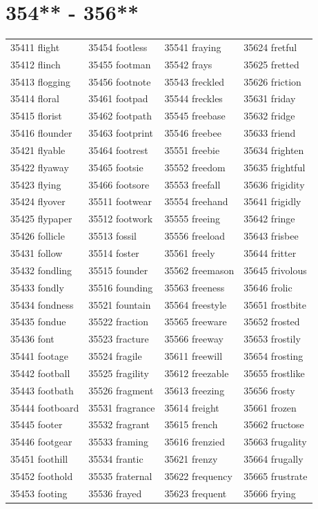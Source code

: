 \documentclass[10pt, oneside]{book}
\begin{document}
\begin{table}
	\centering
	\section*{354** - 356**}
	\begin{tabular}{l l l l}
35411 flight &35454 footless &35541 fraying &35624 fretful\\
35412 flinch &35455 footman &35542 frays &35625 fretted\\
35413 flogging &35456 footnote &35543 freckled &35626 friction\\
35414 floral &35461 footpad &35544 freckles &35631 friday\\
35415 florist &35462 footpath &35545 freebase &35632 fridge\\
35416 flounder &35463 footprint &35546 freebee &35633 friend\\
35421 flyable &35464 footrest &35551 freebie &35634 frighten\\
35422 flyaway &35465 footsie &35552 freedom &35635 frightful\\
35423 flying &35466 footsore &35553 freefall &35636 frigidity\\
35424 flyover &35511 footwear &35554 freehand &35641 frigidly\\
35425 flypaper &35512 footwork &35555 freeing &35642 fringe\\
35426 follicle &35513 fossil &35556 freeload &35643 frisbee\\
35431 follow &35514 foster &35561 freely &35644 fritter\\
35432 fondling &35515 founder &35562 freemason &35645 frivolous\\
35433 fondly &35516 founding &35563 freeness &35646 frolic\\
35434 fondness &35521 fountain &35564 freestyle &35651 frostbite\\
35435 fondue &35522 fraction &35565 freeware &35652 frosted\\
35436 font &35523 fracture &35566 freeway &35653 frostily\\
35441 footage &35524 fragile &35611 freewill &35654 frosting\\
35442 football &35525 fragility &35612 freezable &35655 frostlike\\
35443 footbath &35526 fragment &35613 freezing &35656 frosty\\
35444 footboard &35531 fragrance &35614 freight &35661 frozen\\
35445 footer &35532 fragrant &35615 french &35662 fructose\\
35446 footgear &35533 framing &35616 frenzied &35663 frugality\\
35451 foothill &35534 frantic &35621 frenzy &35664 frugally\\
35452 foothold &35535 fraternal &35622 frequency &35665 frustrate\\
35453 footing &35536 frayed &35623 frequent &35666 frying\\
	\end{tabular}
 \end{table}
\clearpage
\end{document}
